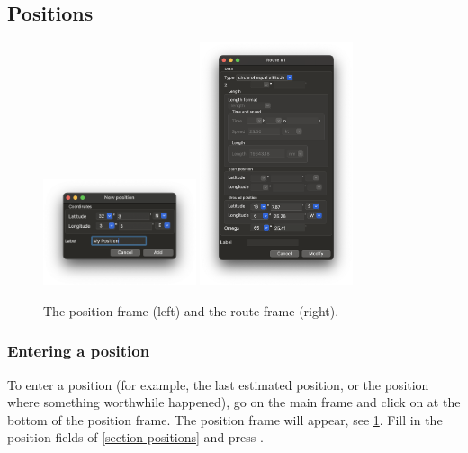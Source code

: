 \documentclass{ol-softwaremanual}
\begin{document}
\subsection{Positions}\label{section-position}

\begin{figure}
  \centering
  \includegraphics[width=0.4\textwidth]{figures/position-frame.png}
  \includegraphics[width=0.4\textwidth]{figures/route-frame.png}
  \caption{
    \label{fig-position-route-frame}
    The \gls{position} frame (left) and the  \gls{route} frame (right).  
  }
\end{figure}


\subsubsection{Entering a \gls{position}}\label{section-enter-position}

To enter a \gls{position}  (for example, the last estimated \gls{position}, or the \gls{position} where something worthwhile happened), go on the main frame and click on  at the bottom of the \gls{position} frame. The \gls{position} frame will appear, see \cref{fig-position-route-frame}. Fill in the \gls{position} fields of \cref{section-positions} and press . 
\end{document}
